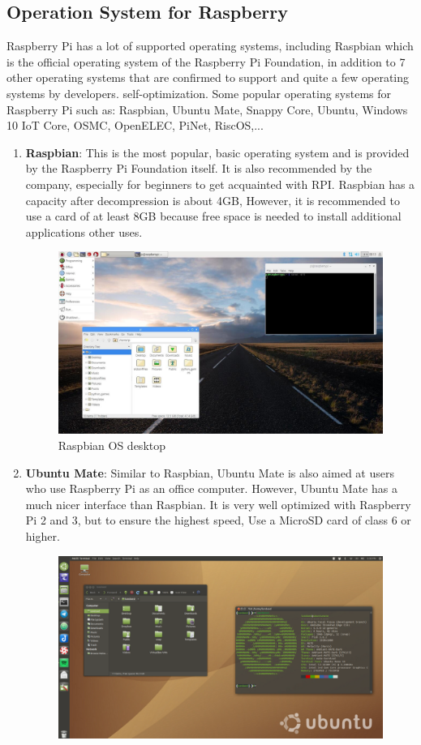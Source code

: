     \subsection{Operation System for Raspberry}
        Raspberry Pi has a lot of supported operating systems, including Raspbian which is the official operating system of the Raspberry Pi Foundation, in addition to 7 other operating systems that are confirmed to support and quite a few operating 
        systems by developers. self-optimization. Some popular operating systems for Raspberry Pi such as: Raspbian, Ubuntu Mate, Snappy
        Core, Ubuntu, Windows 10 IoT Core, OSMC, OpenELEC, PiNet, RiscOS,...  \\
        \begin{enumerate}
            \item \textbf{Raspbian}: This is the most popular, basic operating system and is provided by the Raspberry Pi Foundation itself. It is also recommended by the company, especially for beginners to get acquainted with RPI. Raspbian has a capacity after decompression is about 4GB,
            However, it is recommended to use a card of at least 8GB because free space is needed to install additional applications other uses.
            \begin{figure}[H]
                \centering
                \includegraphics[width=0.6\linewidth]{img/Raspbian.jpg}
                \caption{Raspbian OS desktop}
            \end{figure}
            \item \textbf{Ubuntu Mate}: Similar to Raspbian, Ubuntu Mate is also aimed at users who use Raspberry Pi as an office computer. However, Ubuntu Mate has a much nicer interface than Raspbian. It is very well optimized with Raspberry Pi 2 and 3, but to ensure the highest speed,
            Use a MicroSD card of class 6 or higher.
            \begin{figure}[H]
                \centering
                \includegraphics[width=0.6\linewidth]{img/Ubuntu-mate.png}

\end{figure}
\end{enumerate}
